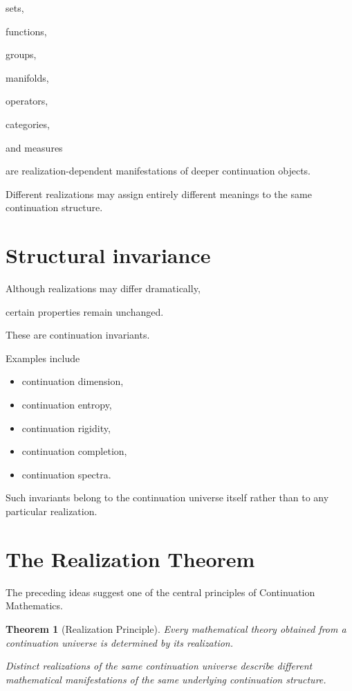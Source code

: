 \documentclass[13pt,openany]{book}
\theoremstyle{plain}
\newtheorem{theorem}{Theorem}[chapter]
\theoremstyle{definition}
\begin{document}
sets,

functions,

groups,

manifolds,

operators,

categories,

and measures

are realization-dependent manifestations of deeper continuation objects.

Different realizations may assign entirely different meanings to the same continuation structure.


\section{Structural invariance}

Although realizations may differ dramatically,

certain properties remain unchanged.

These are continuation invariants.

Examples include

\begin{itemize}

\item continuation dimension,

\item continuation entropy,

\item continuation rigidity,

\item continuation completion,

\item continuation spectra.

\end{itemize}

Such invariants belong to the continuation universe itself rather than to any particular realization.


\section{The Realization Theorem}

The preceding ideas suggest one of the central principles of Continuation Mathematics.

\begin{theorem}[Realization Principle]

Every mathematical theory obtained from a continuation universe is determined by its realization.

Distinct realizations of the same continuation universe describe different mathematical manifestations of the same underlying continuation structure.

\end{theorem}
\end{document}
